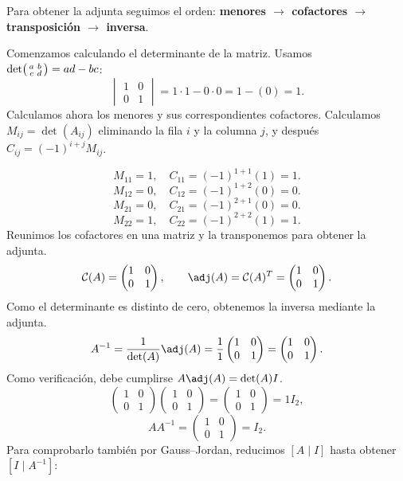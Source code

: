 Para obtener la adjunta seguimos el orden: \textbf{menores $\to$ cofactores $\to$ transposición $\to$ inversa}.

Comenzamos calculando el determinante de la matriz.
Usamos $\det\begin{psmallmatrix}a&b\\c&d\end{psmallmatrix}=ad-bc$:
\[
\begin{vmatrix}1&0\\0&1\end{vmatrix}=1\cdot 1-0\cdot 0=1-(0)=1.
\]
Calculamos ahora los menores y sus correspondientes cofactores. Calculamos $M_{ij}=\det(A_{ij})$ eliminando la fila $i$ y la columna $j$, y después $C_{ij}=(-1)^{i+j}M_{ij}$.

\[
M_{11}=1,\quad C_{11}=(-1)^{1+1}(1)=1.
\]
\[
M_{12}=0,\quad C_{12}=(-1)^{1+2}(0)=0.
\]
\[
M_{21}=0,\quad C_{21}=(-1)^{2+1}(0)=0.
\]
\[
M_{22}=1,\quad C_{22}=(-1)^{2+2}(1)=1.
\]
Reunimos los cofactores en una matriz y la transponemos para obtener la adjunta.
\[
\mathcal{C}(A)=\begin{pmatrix}1&0\\0&1\end{pmatrix},\qquad\adj(A)=\mathcal{C}(A)^T=\begin{pmatrix}1&0\\0&1\end{pmatrix}.
\]
Como el determinante es distinto de cero, obtenemos la inversa mediante la adjunta.
\[
A^{-1}=\frac1{\det(A)}\adj(A)=\frac1{1}\begin{pmatrix}1&0\\0&1\end{pmatrix}=\begin{pmatrix}1&0\\0&1\end{pmatrix}.
\]
Como verificación, debe cumplirse $A\adj(A)=\det(A)I$.
\[
\begin{pmatrix}1&0\\0&1\end{pmatrix}\begin{pmatrix}1&0\\0&1\end{pmatrix}=\begin{pmatrix}1&0\\0&1\end{pmatrix}=1I_{2},
\]
\[
AA^{-1}=\begin{pmatrix}1&0\\0&1\end{pmatrix}=I_{2}.
\]
Para comprobarlo también por Gauss--Jordan, reducimos $[A\mid I]$ hasta obtener $[I\mid A^{-1}]$:

